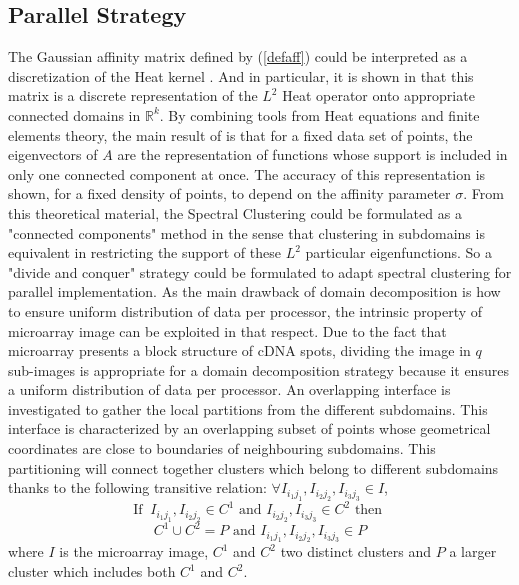 \documentclass[runningheads,a4paper]{llncs}
\begin{document}
\subsection{Parallel Strategy}

The Gaussian affinity matrix defined by (\ref{defaff}) could be interpreted as
a discretization of the Heat kernel \cite{eigen}. And in particular, it is
shown in \cite{icdmke} that this matrix is a discrete representation of the
$L^2$ Heat operator onto appropriate connected domains in $\mathbb{R}^k$. By
combining tools from Heat equations and finite elements theory, the main
result of  \cite{icdmke} is that for a fixed data set of points, the
eigenvectors of $A$ are the representation of functions whose support is
included in only one connected component at once. The accuracy of this
representation is shown, for a fixed density of points, to depend on the
affinity parameter $\sigma$.
From this theoretical material, the Spectral Clustering could be formulated as
a "connected components" method in the sense that clustering in subdomains
is equivalent in restricting the support of these $L^2$ particular
eigenfunctions.
So a "divide and conquer" strategy could be formulated to adapt spectral
clustering for parallel implementation. As the main drawback of domain
decomposition is how to ensure uniform distribution of data per processor, the
intrinsic property of microarray image can be exploited in that respect. Due
to the fact that microarray presents a block structure of cDNA spots, dividing
the image in $q$ sub-images is appropriate for a domain decomposition strategy
because it ensures a uniform distribution of data per processor.
An overlapping interface is investigated to gather the local partitions from
the different subdomains.
This interface is characterized by an overlapping subset  of points whose
geometrical coordinates are close to boundaries of neighbouring subdomains.
This partitioning will connect together clusters which belong to different
subdomains thanks to the following transitive relation:
$\forall I_{i_1j_1}, I_{i_2j_2}, I_{i_3j_3} \in I$, \\
$$
\text{If } \ I_{i_1j_1}, I_{i_2j_2} \in C^1  \text{ and }   I_{i_2j_2}, I_{i_3j_3} \in C^2 \text{ then } $$
\begin{equation}
 C^1 \cup C^2 = P \text{ and } I_{i_1j_1}, I_{i_2j_2}, I_{i_3j_3} \in P \label{reltrans}
\end{equation}
where $I$ is the microarray image, $C^1$ and $C^2$ two distinct clusters and
$P$ a larger cluster which includes both $C^1$ and $C^2$.
\end{document}
